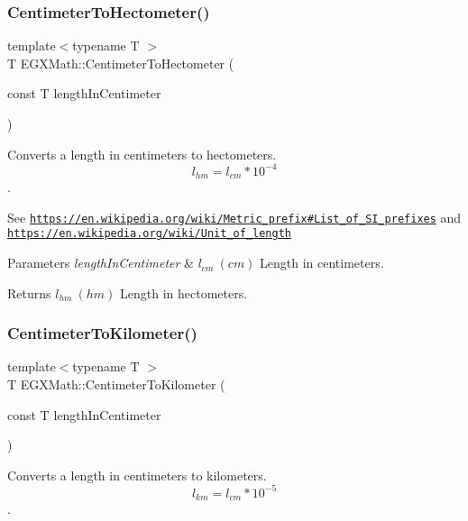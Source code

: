 \subsubsection{\texorpdfstring{Centimeter\+To\+Hectometer()}{CentimeterToHectometer()}}
{\footnotesize\ttfamily template$<$typename T $>$ \\
T E\+G\+X\+Math\+::\+Centimeter\+To\+Hectometer (\begin{DoxyParamCaption}\item[{const T}]{length\+In\+Centimeter }\end{DoxyParamCaption})}



Converts a length in centimeters to hectometers. \[ l_{hm}=l_{cm} * 10^{-4} \]. 

See \href{https://en.wikipedia.org/wiki/Metric_prefix#List_of_SI_prefixes}{\tt https\+://en.\+wikipedia.\+org/wiki/\+Metric\+\_\+prefix\#\+List\+\_\+of\+\_\+\+S\+I\+\_\+prefixes} and \href{https://en.wikipedia.org/wiki/Unit_of_length}{\tt https\+://en.\+wikipedia.\+org/wiki/\+Unit\+\_\+of\+\_\+length} 
\begin{DoxyParams}{Parameters}
{\em length\+In\+Centimeter} & $ l_{cm}\ (cm)$ Length in centimeters. \\
\hline
\end{DoxyParams}
\begin{DoxyReturn}{Returns}
$ l_{hm}\ (hm)$ Length in hectometers. 
\end{DoxyReturn}
\mbox{\label{group___e_g_x_math-_conversions-_length_conversions-_s_i-_centimeter-_s_i_ga3735c75e13286501568075ee1dfb97b7}} 
\subsubsection{\texorpdfstring{Centimeter\+To\+Kilometer()}{CentimeterToKilometer()}}
{\footnotesize\ttfamily template$<$typename T $>$ \\
T E\+G\+X\+Math\+::\+Centimeter\+To\+Kilometer (\begin{DoxyParamCaption}\item[{const T}]{length\+In\+Centimeter }\end{DoxyParamCaption})}



Converts a length in centimeters to kilometers. \[ l_{km}=l_{cm} * 10^{-5} \]. 

